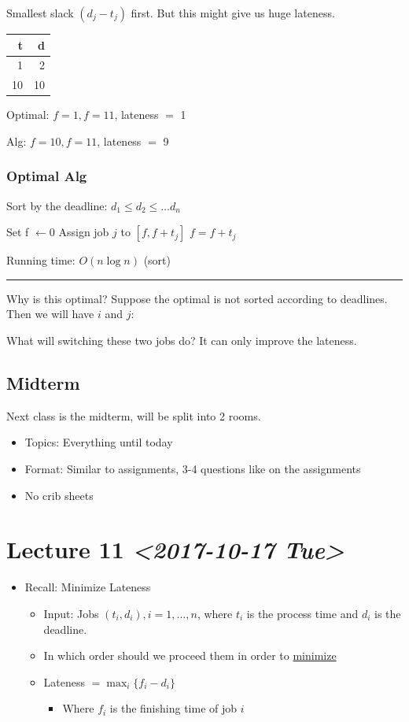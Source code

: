 \documentclass[11pt]{article}
\begin{document}
Smallest slack \((d_j-t_j)\) first. But this might give us huge lateness.
\begin{center}
\begin{tabular}{rr}
t & d\\
\hline
1 & 2\\
10 & 10\\
\end{tabular}
\end{center}
Optimal: \(f=1, f=11\), lateness \(=\) 1

Alg: \(f=10, f=11\), lateness \(=\) 9
\subsubsection{Optimal Alg}
\label{sec:org90bd55c}
Sort by the deadline: \(d_1 \leq d_2 \leq \ldots d_n\)
\begin{algorithmic}
  \State Set f $\gets 0$
  \State Assign job $j$ to $[f,f+t_j]$
  \State $f=f+t_j$
  \EndFor
\end{algorithmic}
Running time: \(O(n \log n)\) (sort)

\noindent\rule{\textwidth}{0.5pt}
Why is this optimal? Suppose the optimal is not sorted according to deadlines. Then we will have \(i\) and \(j\): 

What will switching these two jobs do? It can only improve the lateness. 
\subsection{Midterm}
\label{sec:org2c0ebbb}
Next class is the midterm, will be split into 2 rooms.
\begin{itemize}
\item Topics: Everything until today
\item Format: Similar to assignments, 3-4 questions like on the assignments
\item No crib sheets
\end{itemize}
\section{Lecture 11 \textit{<2017-10-17 Tue>}}
\label{sec:org7882b12}
\begin{itemize}
\item Recall: Minimize Lateness
\begin{itemize}
\item Input: Jobs \((t_i, d_i), i=1,\ldots,n\), where \(t_i\) is the process time and \(d_i\) is the deadline.
\item In which order should we proceed them in order to \uline{minimize}
\item Lateness \(=\max_i \{f_i - d_i\}\)
\begin{itemize}
\item Where \(f_i\) is the finishing time of job \(i\)
\end{itemize}
\end{itemize}
\end{itemize}
\end{document}
